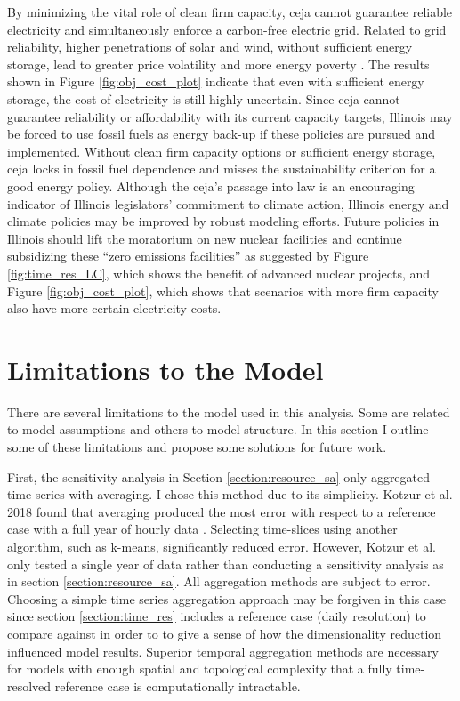 By minimizing the vital role of clean firm capacity, \gls{ceja} cannot guarantee
reliable electricity and simultaneously enforce a carbon-free electric grid. Related to grid
reliability, higher penetrations of solar and wind, without sufficient energy
storage, lead to greater price volatility \cite{winkler_impact_2016, blazquez_renewable_2018}
and more energy poverty \cite{henry_how_2021}. The results shown in Figure
\ref{fig:obj_cost_plot} indicate that even with sufficient energy storage, the cost
of electricity is still highly uncertain. Since
\gls{ceja} cannot guarantee reliability or affordability with its current capacity
targets, Illinois may be forced to use fossil fuels as energy back-up if these
policies are pursued and implemented. Without
clean firm capacity options or sufficient energy storage, \gls{ceja} locks in
fossil fuel dependence and misses the sustainability criterion for a good energy policy.
Although the \gls{ceja}'s passage into law is an encouraging indicator of Illinois
legislators' commitment to climate action, Illinois energy and climate policies
may be improved by robust modeling efforts. Future
policies in Illinois should lift the moratorium on new nuclear facilities and
continue subsidizing these ``zero emissions facilities'' as suggested by Figure
\ref{fig:time_res_LC}, which shows the benefit of advanced nuclear projects,
and Figure \ref{fig:obj_cost_plot}, which shows that scenarios with more firm
capacity also have more certain electricity costs.

\section{Limitations to the Model}

There are several limitations to the model used in this analysis. Some are related
to model assumptions and others to model structure. In this section I outline some
of these limitations and propose some solutions for future work.

First, the sensitivity analysis in Section \ref{section:resource_sa} only aggregated
time series with averaging. I chose this method due to its simplicity. Kotzur
et al. 2018 found that averaging produced the most error with respect to a
reference case with a full year of
hourly data \cite{kotzur_impact_2018}. Selecting time-slices using another algorithm,
such as k-means, significantly reduced error. However, Kotzur et al. only tested a single
year of data rather than conducting a sensitivity analysis as in section
\ref{section:resource_sa}. All aggregation methods are subject to error. Choosing
a simple time series aggregation approach may be forgiven in this case since section
\ref{section:time_res} includes a reference case (daily resolution) to compare against
in order to to give a sense of how the dimensionality reduction influenced model
results. Superior temporal aggregation methods are necessary for models with enough
spatial and topological complexity that a fully time-resolved reference case is
computationally intractable.

